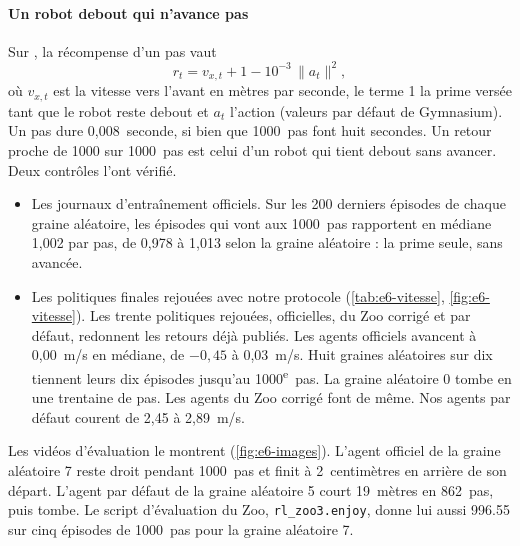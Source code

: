 \paragraph{Un robot debout qui n'avance pas}
Sur , la récompense d'un pas vaut
\begin{equation}
  r_t = v_{x,t} + 1 - 10^{-3}\,\lVert a_t\rVert^2,
\end{equation}
où $v_{x,t}$ est la vitesse vers l'avant en mètres par seconde, le terme 1 la prime versée tant que le robot
reste debout et $a_t$ l'action (valeurs par défaut de Gymnasium). Un pas dure 0,008~seconde, si bien que
\num{1000}~pas font huit secondes. Un retour proche de \num{1000} sur \num{1000}~pas est celui d'un robot qui
tient debout sans avancer. Deux contrôles l'ont vérifié.
\begin{itemize}
  \item Les journaux d'entraînement officiels. Sur les 200 derniers épisodes de chaque graine
    aléatoire, les épisodes qui vont aux \num{1000}~pas rapportent en médiane 1,002 par pas, de 0,978 à
    1,013 selon la graine aléatoire : la prime seule, sans avancée.
  \item Les politiques finales rejouées avec notre protocole (\cref{tab:e6-vitesse},
    \cref{fig:e6-vitesse}). Les trente politiques rejouées, officielles, du Zoo corrigé et par défaut, redonnent
    les retours déjà publiés. Les agents officiels
    avancent à 0,00~m/s en médiane, de $-0{,}45$ à 0,03~m/s. Huit graines aléatoires sur dix tiennent leurs
    dix épisodes jusqu'au \num{1000}\textsuperscript{e}~pas. La graine aléatoire 0 tombe en une trentaine de
    pas. Les agents du Zoo corrigé font de même. Nos agents par défaut courent de 2,45 à 2,89~m/s.
\end{itemize}
Les vidéos d'évaluation le montrent (\cref{fig:e6-images}). L'agent officiel de la graine aléatoire 7 reste
droit pendant \num{1000}~pas et finit à 2~centimètres en arrière de son départ. L'agent par défaut de la graine
aléatoire 5 court 19~mètres en 862~pas, puis tombe. Le script d'évaluation du Zoo,
\texttt{rl\_zoo3.enjoy}, donne lui aussi \num{996,55} sur cinq épisodes de \num{1000}~pas pour la graine
aléatoire 7.




